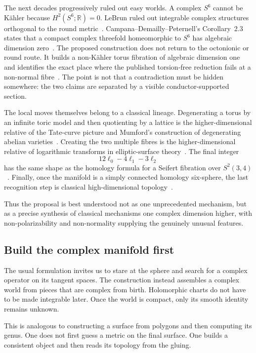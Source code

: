 \documentclass[11pt,reqno]{amsart}
\numberwithin{equation}{section}
\newcommand{\R}{\mathbb R}
\theoremstyle{definition}
\begin{document}
The next decades progressively ruled out easy worlds. A complex $S^6$ cannot be K\"ahler because $H^2(S^6;\R)=0$. LeBrun ruled out integrable complex structures orthogonal to the round metric~\cite{LeBrun}. Campana--Demailly--Peternell's Corollary~2.3 states that a compact complex threefold homeomorphic to $S^6$ has algebraic dimension zero~\cite{CDP20}. The proposed construction does not return to the octonionic or round route. It builds a non-K\"ahler torus fibration of algebraic dimension one and identifies the exact place where the published torsion-free reduction fails at a non-normal fibre~\cite[\S10]{S6}. The point is not that a contradiction must be hidden somewhere: the two claims are separated by a visible conductor-supported section.

The local moves themselves belong to a classical lineage. Degenerating a torus by an infinite toric model and then quotienting by a lattice is the higher-dimensional relative of the Tate-curve picture and Mumford's construction of degenerating abelian varieties~\cite{BHPV,Mumford}. Creating the two multiple fibres is the higher-dimensional relative of logarithmic transforms in elliptic-surface theory~\cite{BHPV}. The final integer
\[
12\ell_0-4\ell_1-3\ell_2
\]
has the same shape as the homology formula for a Seifert fibration over $S^2(3,4)$~\cite{Orlik}. Finally, once the manifold is a simply connected homology six-sphere, the last recognition step is classical high-dimensional topology~\cite{Smale,KM}.

Thus the proposal is best understood not as one unprecedented mechanism, but as a precise synthesis of classical mechanisms one complex dimension higher, with non-polarizability and non-normality supplying the genuinely unusual features.

\subsection{Build the complex manifold first}

The usual formulation invites us to stare at the sphere and search for a complex operator on its tangent spaces. The construction instead assembles a complex world from pieces that are complex from birth. Holomorphic charts do not have to be made integrable later. Once the world is compact, only its smooth identity remains unknown.

This is analogous to constructing a surface from polygons and then computing its genus. One does not first guess a metric on the final surface. One builds a consistent object and then reads its topology from the gluing.
\end{document}
